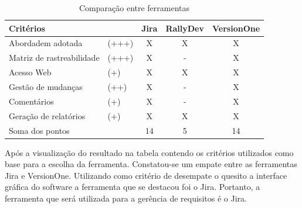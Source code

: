 \begin{table}[H]
    \centering
    \label{comparaFerramentas}
    \caption{Comparação entre ferramentas}
    \begin{tabular}{ll|c|c|c}
        \hline
        Critérios & & Jira &  RallyDev & VersionOne \\ [6pt]
        \hline
        Abordadem adotada & (+++) & X & X & X\\
        \hline
        Matriz de rastreabilidade & (+++) & X & - & X \\
        \hline
        Acesso Web & (+) & X & X & X \\
        \hline
        Gestão de mudanças & (++) & X & - & X\\
        \hline
        Comentários & (+) & X & - & X \\
        \hline
        Geração de relatórios & (+) & X & X & X \\
        \hline
        Soma dos pontos & & 14 & 5 & 14 \\
        \hline
    \end{tabular}
\end{table}

Após a visualização do resultado na tabela contendo os critérios utilizados como base para a escolha da ferramenta. Constatou-se um empate entre as ferramentas Jira e VersionOne. Utilizando como critério de desempate o quesito a interface gráfica do software a ferramenta que se destacou foi o Jira. Portanto, a ferramenta que será utilizada para a gerência de requisitos é o Jira.
